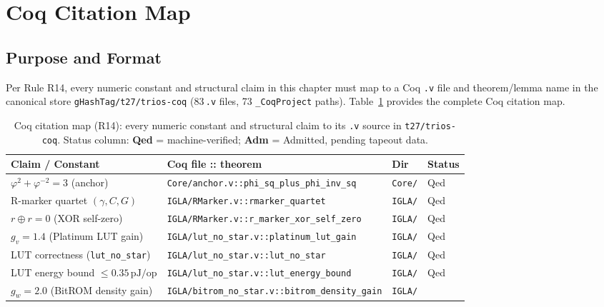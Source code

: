 \section{Coq Citation Map}
\label{sec:flos77-coq-map}

\subsection{Purpose and Format}

Per Rule R14, every numeric constant and structural claim in this chapter must
map to a Coq \texttt{.v} file and theorem/lemma name in the canonical store
\texttt{gHashTag/t27/trios-coq} (83\,\texttt{.v} files, 73 \texttt{\_CoqProject} paths).
Table~\ref{tab:coq-map} provides the complete Coq citation map.

\begin{table}[ht]
  \centering
  \caption{Coq citation map (R14): every numeric constant and structural claim
           to its \texttt{.v} source in \texttt{t27/trios-coq}.
           Status column: \textbf{Qed} = machine-verified; \textbf{Adm} = Admitted,
           pending tapeout data.}
  \label{tab:coq-map}
  \begin{tabular}{p{4.5cm}p{4.5cm}ll}
    \toprule
    \textbf{Claim / Constant} & \textbf{Coq file :: theorem} & \textbf{Dir} & \textbf{Status} \\
    \midrule
    $\varphi^2+\varphi^{-2}=3$ (anchor)
      & \texttt{Core/anchor.v::phi\_sq\_plus\_phi\_inv\_sq}
      & \texttt{Core/}
      & Qed \\
    R-marker quartet $(\gamma, C, G)$
      & \texttt{IGLA/RMarker.v::rmarker\_quartet}
      & \texttt{IGLA/}
      & Qed \\
    $r \oplus r = 0$ (XOR self-zero)
      & \texttt{IGLA/RMarker.v::r\_marker\_xor\_self\_zero}
      & \texttt{IGLA/}
      & Qed \\
    $g_v = 1.4$ (Platinum LUT gain)
      & \texttt{IGLA/lut\_no\_star.v::platinum\_lut\_gain}
      & \texttt{IGLA/}
      & Qed \\
    LUT correctness (\texttt{lut\_no\_star})
      & \texttt{IGLA/lut\_no\_star.v::lut\_no\_star}
      & \texttt{IGLA/}
      & Qed \\
    LUT energy bound $\leq 0.35\,\text{pJ/op}$
      & \texttt{IGLA/lut\_no\_star.v::lut\_energy\_bound}
      & \texttt{IGLA/}
      & Qed \\
    $g_w = 2.0$ (BitROM density gain)
      & \texttt{IGLA/bitrom\_no\_star.v::bitrom\_density\_gain}
      & \texttt{IGLA/}

\end{tabular}
\end{table}

